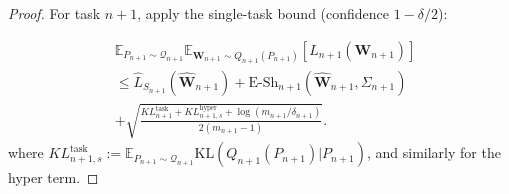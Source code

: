 \documentclass[letterpaper]{article} %
\begin{document}
\begin{proof}
For task $n+1$, apply the single-task bound (confidence $1-\delta/2$):


\begin{equation}
\begin{aligned}
    &\mathbb{E}_{P_{n+1} \sim \mathcal{Q}_{n+1}} \mathbb{E}_{\mathbf{W}_{n+1} \sim Q_{n+1}(P_{n+1})} [L_{n+1}(\mathbf{W}_{n+1})]  \\
&\le \widehat{L}_{S_{n+1}}(\hat{\mathbf{W}}_{n+1}) + \mathrm{E\text{-}Sh}_{n+1}(\hat{\mathbf{W}}_{n+1}, \Sigma_{n+1})  \\
&+ \sqrt{\frac{KL^{\text{task}}_{n+1} + KL^{\text{hyper}}_{n+1,s} + \log(m_{n+1}/\delta_{n+1})}{2(m_{n+1} - 1)}}.
\end{aligned}
\label{eq:com2}
\end{equation}
where $KL^{\text{task}}_{n+1,s} := \mathbb{E}_{P_{n+1} \sim \mathcal{Q}_{n+1}} \mathrm{KL}(Q_{n+1}(P_{n+1}) | P_{n+1})$, and similarly for the hyper term.










\end{proof}
\end{document}
